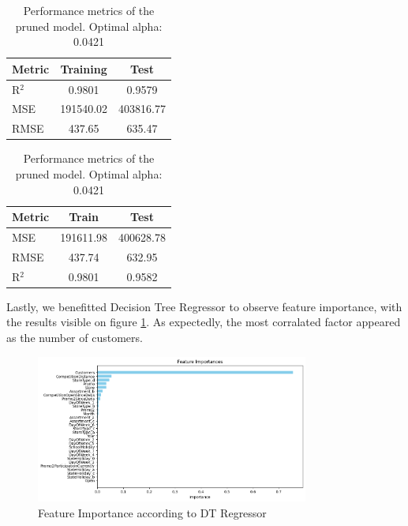 \documentclass[12pt]{report}
\begin{document}
\begin{table}[H] %
    \centering
    \begin{minipage}{0.48\textwidth} %
        \centering
        \begin{tabular}{|l|c|c|}
            \hline
            \textbf{Metric} & \textbf{Training} & \textbf{Test} \\
            \hline
            R\(^2\) & 0.9801 & 0.9579 \\
            \hline
            MSE & 191540.02 & 403816.77 \\
            \hline
            RMSE & 437.65 & 635.47 \\
            \hline
        \end{tabular}
        \caption{Performance metrics for the Decision Tree Regressor with the best parameters found.}
        \label{tab:performance_metrics}
    \end{minipage}\hfill
    \begin{minipage}{0.48\textwidth} %
        \centering
        \begin{tabular}{|l|c|c|}
            \hline
            \textbf{Metric} & \textbf{Train} & \textbf{Test} \\
            \hline
            MSE & 191611.98 & 400628.78 \\
            \hline
            RMSE & 437.74 & 632.95 \\
            \hline
            R\(^2\) & 0.9801 & 0.9582 \\
            \hline
        \end{tabular}
        \caption{Performance metrics of the pruned model. Optimal alpha: 0.0421}
        \label{tab:pruned_model_metrics}
    \end{minipage}
\end{table}

Lastly, we benefitted Decision Tree Regressor to observe feature importance, with the results visible on figure \ref{fig:feature_image}. As expectedly, the most corralated factor appeared as the number of customers. 

\begin{figure}[H] %
    \centering
    \includegraphics[width=0.8\textwidth]{feature.png} %
    \caption{Feature Importance according to DT Regressor} %
    \label{fig:feature_image} %
\end{figure}
\end{document}

